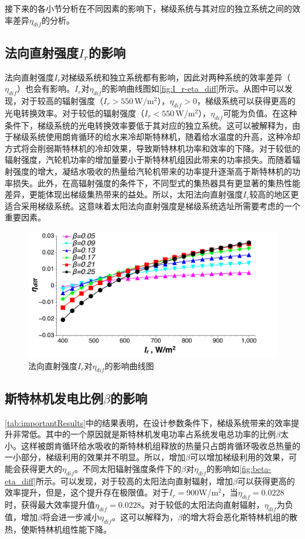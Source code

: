 接下来的各小节分析在不同因素的影响下，梯级系统与其对应的独立系统之间的效率差异$\eta_{dif}$的分析。
\subsection{法向直射强度$I_r$的影响}
\label{sec:I_r}

法向直射强度$I_r$对梯级系统和独立系统都有影响，因此对两种系统的效率差异（$\eta_{dif}$）也会有影响。$I_r$对$\eta_{dif}$的影响曲线图如\autoref{fig:I_r-eta_diff}所示。从图中可以发现，对于较高的辐射强度（$I_r > 550\,\mathrm{W/m^2}$），$\eta_{dif}>0$，梯级系统可以获得更高的光电转换效率。对于较低的辐射强度（$I_r < 550\,$W/m$^2$），$\eta_{dif}$可能为负值。在这种条件下，梯级系统的光电转换效率要低于其对应的独立系统。这可以被解释为，由于梯级系统使用朗肯循环的给水来冷却斯特林机，随着给水温度的升高，这种冷却方式将会削弱斯特林机的冷却效果，导致斯特林机功率和效率的下降。对于较低的辐射强度，汽轮机功率的增加量要小于斯特林机组因此带来的功率损失。而随着辐射强度的增大，凝结水吸收的热量给汽轮机带来的功率提升逐渐高于斯特林机的功率损失。此外，在高辐射强度的条件下，不同型式的集热器具有更显著的集热性能差异，更能体现出梯级集热带来的益处。所以，太阳法向直射强度$I_r$较高的地区更适合采用梯级系统。这意味着太阳法向直射强度是梯级系统选址所需要考虑的一个重要因素。
\begin{figure}[htbp]
	\centering
	\includegraphics[width = 0.9\columnwidth, angle = 0]{fig/I_r-eta_diff}
	\caption{法向直射强度$I_r$对$\eta_{dif}$的影响曲线图}
	\label{fig:I_r-eta_diff}
\end{figure}

\subsection{斯特林机发电比例$\beta$的影响}

\autoref{tab:importantResults}中的结果表明，在设计参数条件下，梯级系统带来的效率提升非常低。其中的一个原因就是斯特林机发电功率占系统发电总功率的比例$\beta$太小。这样被朗肯循环给水吸收的斯特林机组释放的热量只占朗肯循环吸收总热量的一小部分，梯级利用的效果并不明显。所以，增加$\beta$可以增加梯级利用的效果，可能会获得更大的$\eta_{dif}$。不同太阳辐射强度条件下的$\beta$对$\eta_{dif}$的影响如\autoref{fig:beta-eta_diff}所示。可以发现，对于较高的太阳法向直射辐射，增加$\beta$可以获得更高的效率提升，但是，这个提升存在极限值。对于$I_r=900$W/m$^2$，当$\eta_{dif}=0.0228$时，获得最大效率提升值$\eta_{dif}=0.0228$。对于较低的太阳法向直射辐射，$\eta_{dif}$为负值，增加$\beta$将会进一步减小$\eta_{dif}$。这可以解释为，$\beta$的增大将会恶化斯特林机组的散热，使斯特林机组性能下降。

